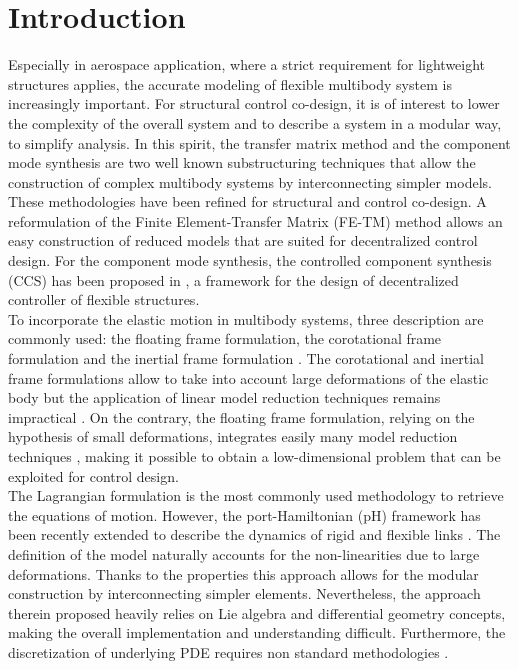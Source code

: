 \documentclass{svjour3}                     %
\begin{document}
\section{Introduction}
\label{intro}
Especially in aerospace application, where a strict requirement for lightweight structures applies, the accurate modeling  of flexible multibody system is increasingly important. For structural control co-design, it is of interest to lower the complexity of the overall system and to describe a system in a modular way, to simplify analysis. In this spirit, the transfer matrix method \cite{Rui2005} and the component mode synthesis \cite{HurtyCMS} are two well known substructuring techniques that allow the construction of complex multibody systems by interconnecting simpler models. These methodologies have been refined for structural and control co-design. A reformulation of the Finite Element-Transfer Matrix (FE-TM) method \cite{TAN199047} allows an easy construction of reduced models that are suited for decentralized control design. For the component mode synthesis, the controlled component synthesis (CCS) has been proposed in \cite{YoungCMS}, a framework for the design of decentralized controller of flexible structures. \\
To incorporate the elastic motion in multibody systems, three description are commonly used: the floating frame formulation, the corotational frame formulation and the inertial frame formulation \cite{Ellenbroek2018}. The corotational and inertial frame formulations allow to take into account large deformations of the elastic body but the application of linear model reduction techniques remains impractical \cite{Noor_rev}. On the contrary, the floating frame formulation, relying on the hypothesis of small deformations, integrates easily many model reduction techniques \cite{NOWAKOWSKI201240}, making it possible to obtain a low-dimensional problem that can be exploited for control design. \\
The Lagrangian formulation is the most commonly used methodology to retrieve the equations of motion. However, the port-Hamiltonian (pH) framework \cite{bookPHs} has been recently extended to describe the dynamics of rigid and flexible links \cite{macchelli_fl,macchelli_flrig}. The definition of the model naturally accounts for the non-linearities due to large deformations. Thanks to the properties  this approach allows for the modular construction by interconnecting simpler elements. Nevertheless, the approach therein proposed heavily relies on Lie algebra and differential geometry concepts, making the overall implementation and understanding difficult. Furthermore, the discretization of underlying PDE requires non standard methodologies \cite{Golo}. \\
\end{document}
